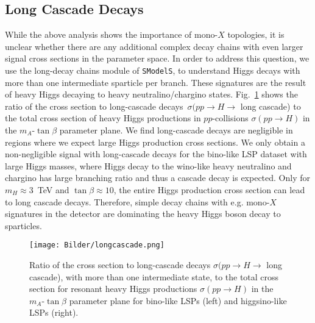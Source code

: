 \documentclass[11pt,a4paper]{article}
\begin{document}
\subsection*{Long Cascade Decays}
While the above analysis shows the importance of mono-$X$ topologies, it is unclear whether there are any additional complex decay chains with even larger signal cross sections in the parameter space. In order to address this question, we use the long-decay chains module of \texttt{SModelS}, to understand Higgs decays with more than one intermediate sparticle per branch. These signatures are the result of heavy Higgs decaying to heavy neutralino/chargino states. Fig.~\ref{fig_cascade} shows the ratio of the cross section to long-cascade decays~$\sigma(pp\rightarrow H \rightarrow$ long cascade) to the total cross section of heavy Higgs productions in $pp$-collisions $\sigma(pp\rightarrow H)$ in the $m_A$-$\tan\beta$ parameter plane. We find long-cascade decays are negligible in regions where we expect large Higgs production cross sections. We only obtain a non-negligible signal with long-cascade decays for the bino-like LSP dataset with large Higgs masses, where Higgs decay to the wino-like heavy neutralino and chargino has large branching ratio and thus a cascade decay is expected. Only for $m_H \approx 3$~TeV and $\tan\beta \approx 10$, the entire Higgs production cross section can lead to long cascade decays. Therefore, simple decay chains with e.g. mono-$X$ signatures in the detector are dominating the heavy Higgs boson decay to sparticles.

\begin{figure}[h]
\centering
\texttt{[image: Bilder/longcascade.png]}
\caption{Ratio of the cross section to long-cascade decays $\sigma(pp\rightarrow H \rightarrow$ long cascade), with more than one intermediate state, to the total cross section for resonant heavy Higgs productions $\sigma(pp\rightarrow H)$ in the $m_A$-$\tan\beta$ parameter plane for bino-like LSPs (left) and higgsino-like LSPs (right).}\label{fig_cascade}
\end{figure}
\end{document}
